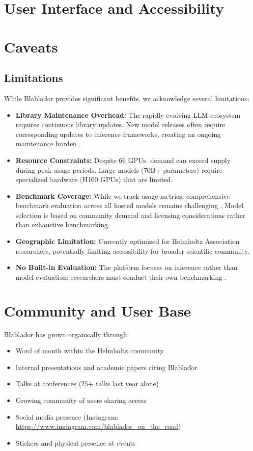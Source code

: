 \documentclass[10pt,conference]{IEEEtran}
\begin{document}
\section{User Interface and Accessibility}

\section{Caveats}


\subsection{Limitations}

While Blablador provides significant benefits, we acknowledge several limitations:

\begin{itemize}
    \item \textbf{Library Maintenance Overhead:} The rapidly evolving LLM ecosystem requires continuous library updates. New model releases often require corresponding updates to inference frameworks, creating an ongoing maintenance burden \cite{vllm}.
    \item \textbf{Resource Constraints:} Despite 66 GPUs, demand can exceed supply during peak usage periods. Large models (70B+ parameters) require specialized hardware (H100 GPUs) that are limited.
    \item \textbf{Benchmark Coverage:} While we track usage metrics, comprehensive benchmark evaluation across all hosted models remains challenging \cite{llmbenchmarks}. Model selection is based on community demand and licensing considerations rather than exhaustive benchmarking.
    \item \textbf{Geographic Limitation:} Currently optimized for Helmholtz Association researchers, potentially limiting accessibility for broader scientific community.
    \item \textbf{No Built-in Evaluation:} The platform focuses on inference rather than model evaluation; researchers must conduct their own benchmarking \cite{llmbenchmarks}.
\end{itemize}

\section{Community and User Base}
Blablador has grown organically through:
\begin{itemize}
    \item Word of mouth within the Helmholtz community
    \item Internal presentations and academic papers citing Blablador
    \item Talks at conferences (25+ talks last year alone)
    \item Growing community of users sharing access
    \item Social media presence (Instagram: \url{https://www.instagram.com/blablador_on_the_road})
    \item Stickers and physical presence at events
\end{itemize}
\end{document}
